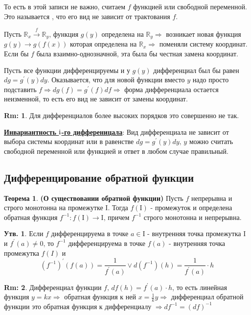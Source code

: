 \documentclass[12pt]{article}
\newcommand{\RN}[1]{%
	\textup{\uppercase\expandafter{\romannumeral#1}}%
}
\newcommand{\MR}{\mathbb{R}}
\newcommand{\MI}{\mathrm{I}}
\theoremstyle{definition}
\newtheorem{rem}{Rm:}
\newtheorem{prop}{Утв.}
\newtheorem{theorem}{Теорема}
\begin{document}
То есть в этой записи не важно, считаем $f$ функцией или свободной переменной. Это называется \uwave{инвариантностью $\RN{1}$-го дифференциала}, что его вид не зависит от трактования $f$.

Пусть $\MR_x \xrightarrow{f} \MR_y$, функция $g(y)$ определена на $\MR_y \Rightarrow$ возникает новая функция $g(y) \rightarrow g(f(x))$ которая определена на $\MR_x \Rightarrow$ поменяли систему координат. Если бы $f$ была взаимно-однозначной, эта была бы честная замена координат. 

Пусть все функции дифференцируемы и у $g(y)$ дифференциал был бы равен $dg = g^\prime(y)dy$. Оказывается, что для новой функции вместо $y$ надо просто подставить $f \Rightarrow dg(f) = g^\prime(f)df \Rightarrow$ форма дифференциала остается неизменной, то есть его вид не зависит от замены координат.

\begin{rem}
	Для дифференциалов более высоких порядков это совершенно не так.
\end{rem}

\uline{\textbf{Инвариантность $\RN{1}$-го дифференицала}}: Вид дифференциала не зависит от выбора системы координат или в равенстве $dg = g^\prime(y)dy, \, y$ можно считать свободной переменной или функцией и ответ в любом случае правильный. 

\subsection*{Дифференцирование обратной функции}

\begin{theorem} \textbf{(О существовании обратной функции)}
	Пусть $f$ непрерывна и строго монотонна на промежутке $\MI$. Тогда $f(\MI)$ - промежуток и определена обратная функция $f^{-1}\colon f(\MI) \to \MI$, причем $f^{-1}$ строго монотонна и непрерывна.
\end{theorem}

\begin{prop}
	Если $f$ дифференцируема в точке $a \in \MI$ - внутренняя точка промежутка $\MI$ и $f^\prime(a) \neq 0$, то $f^{-1}$ дифференцируема в точке $f(a)$ - внутренняя точка промежутка $f(I)$ и $$(f^{-1})^\prime(f(a)) = \dfrac{1}{f^\prime(a)} \vee d(f^{-1})(h) = \dfrac{1}{f^\prime(a)}{\cdot}h$$
\end{prop}

\begin{rem}
	Дифференциал функции $f, \, df(h) = f^\prime(a){\cdot}h$, то есть линейная функция $y = kx \Rightarrow$ обратная функция к ней $x = \frac{1}{k}y \Rightarrow$ дифференциал обратной функции это обратная функция к дифференциалу $\Rightarrow df^{-1} = (df)^{-1}$
\end{rem}
\end{document}
